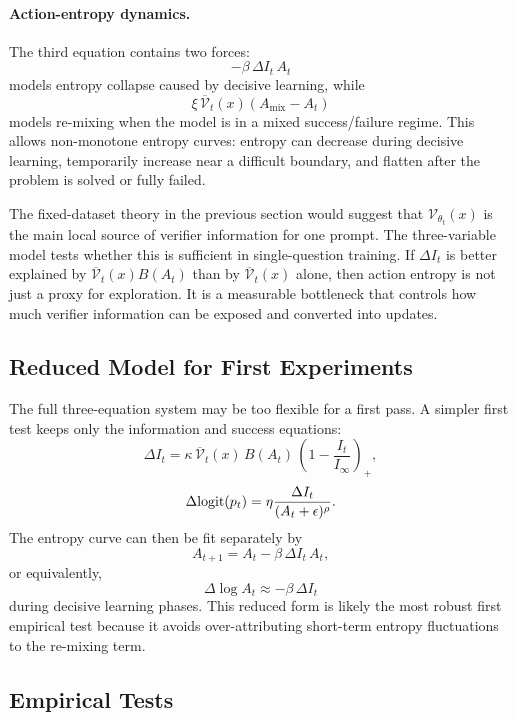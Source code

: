 \paragraph{Action-entropy dynamics.}
The third equation contains two forces:
\[
  -\beta\,\Delta I_t\,A_t
\]
models entropy collapse caused by decisive learning, while
\[
  \xi\,\overline{\mathcal{V}}_t(x)(A_{\mathrm{mix}}-A_t)
\]
models re-mixing when the model is in a mixed success/failure regime. This allows non-monotone entropy curves: entropy can decrease during decisive learning, temporarily increase near a difficult boundary, and flatten after the problem is solved or fully failed.

\begin{discussionbox}[title={Discussion: Why include action entropy?}]
The fixed-dataset theory in the previous section would suggest that $\mathcal{V}_{\theta_t}(x)$ is the main local source of verifier information for one prompt. The three-variable model tests whether this is sufficient in single-question \llm{} training. If $\Delta I_t$ is better explained by $\overline{\mathcal{V}}_t(x)B(A_t)$ than by $\overline{\mathcal{V}}_t(x)$ alone, then action entropy is not just a proxy for exploration. It is a measurable bottleneck that controls how much verifier information can be exposed and converted into updates.
\end{discussionbox}

\subsection{Reduced Model for First Experiments}

The full three-equation system may be too flexible for a first pass. A simpler first test keeps only the information and success equations:
\[
  \Delta I_t
  =
  \kappa\,
  \overline{\mathcal{V}}_t(x)\,
  B(A_t)\,
  \left(1-\frac{I_t}{I_\infty}\right)_+,
\]
\[
  \Delta \mathrm{logit}(p_t)
  =
  \eta
  \frac{\Delta I_t}{(A_t+\epsilon)^\rho}.
\]
The entropy curve can then be fit separately by
\[
  A_{t+1}
  =
  A_t-\beta\,\Delta I_t\,A_t,
\]
or equivalently,
\[
  \Delta \log A_t
  \approx
  -\beta\,\Delta I_t
\]
during decisive learning phases. This reduced form is likely the most robust first empirical test because it avoids over-attributing short-term entropy fluctuations to the re-mixing term.

\subsection{Empirical Tests}

